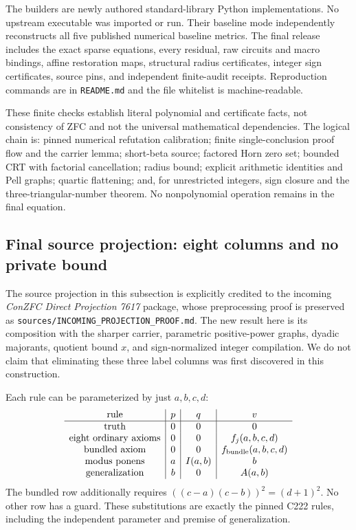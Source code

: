 \documentclass[11pt]{article}
\begin{document}
The builders are newly authored standard-library Python implementations.
No upstream executable was imported or run.  Their baseline mode
independently reconstructs all five published numerical baseline metrics.
The final release includes the exact sparse equations, every residual,
raw circuits and macro bindings, affine restoration maps, structural
radius certificates, integer sign certificates, source pins, and
independent finite-audit receipts.  Reproduction commands are in
\texttt{README.md} and the file whitelist is machine-readable.

These finite checks establish literal polynomial and certificate facts,
not consistency of ZFC and not the universal mathematical dependencies.
The logical chain is: pinned numerical refutation calibration; finite
single-conclusion proof flow and the carrier lemma; short-beta source;
factored Horn zero set; bounded CRT with factorial cancellation; radius bound; explicit arithmetic
identities and Pell graphs; quartic flattening; and, for unrestricted
integers, sign closure and the three-triangular-number theorem.  No
nonpolynomial operation remains in the final equation.

\subsection{Final source projection: eight columns and no private bound}
\label{sec:projected-direct}

The source projection in this subsection is explicitly credited to the
incoming \emph{ConZFC Direct Projection 7617} package, whose preprocessing
proof is preserved as \nolinkurl{sources/INCOMING_PROJECTION_PROOF.md}.
The new result here is its composition with the sharper carrier,
parametric positive-power graphs, dyadic majorants, quotient bound $x$,
and sign-normalized integer compilation.  We do not claim that eliminating
these three label columns was first discovered in this construction.

Each rule can be parameterized by just $a,b,c,d$:
\[
\begin{array}{c|c|c|c}
 \text{rule}&p&q&v\\ \hline
 \text{truth}&0&0&0\\
 \text{eight ordinary axioms}&0&0&f_j(a,b,c,d)\\
 \text{bundled axiom}&0&0&f_{\rm bundle}(a,b,c,d)\\
 \text{modus ponens}&a&I(a,b)&b\\
 \text{generalization}&b&0&A(a,b)
\end{array}
\]
The bundled row additionally requires
$((c-a)(c-b))^2=(d+1)^2$.  No other row has a guard.  These substitutions
are exactly the pinned C222 rules, including the independent
parameter and premise of generalization.
\end{document}
